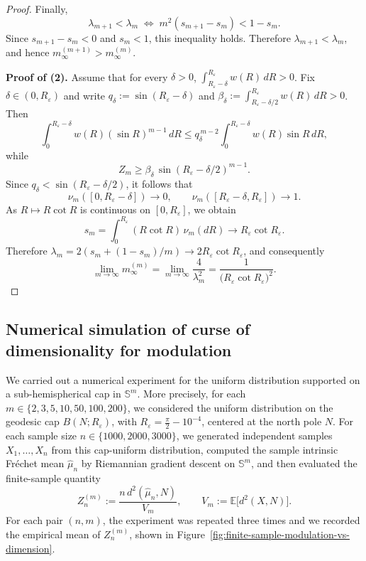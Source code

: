 \documentclass{amsart}
\theoremstyle{definition}
\theoremstyle{remark}
\newcommand\0{\boldsymbol{0}}
\begin{document}
\begin{proof}
Finally,
\[
\lambda_{m+1}<\lambda_m
\;\Longleftrightarrow\;
m^2(s_{m+1}-s_m)<1-s_m.
\]
Since \(s_{m+1}-s_m<0\) and \(s_m<1\), this inequality holds.  Therefore \(\lambda_{m+1}<\lambda_m\), and hence \(m_\infty^{(m+1)}>m_\infty^{(m)}\).

\textbf{Proof of (2).}
Assume that for every \(\delta>0\), \(\int_{R_\varepsilon-\delta}^{R_\varepsilon}w(R)\,dR>0\).  Fix \(\delta\in(0,R_\varepsilon)\) and write \(q_\delta:=\sin(R_\varepsilon-\delta)\) and \(\beta_\delta:=\int_{R_\varepsilon-\delta/2}^{R_\varepsilon}w(R)\,dR>0\).  Then
\[
\int_0^{R_\varepsilon-\delta}w(R)(\sin R)^{m-1}\,dR
\le
q_\delta^{\,m-2}\int_0^{R_\varepsilon-\delta}w(R)\sin R\,dR,
\]
while
\[
Z_m\ge \beta_\delta\,\sin(R_\varepsilon-\delta/2)^{m-1}.
\]
Since \(q_\delta<\sin(R_\varepsilon-\delta/2)\), it follows that
\[
\nu_m([0,R_\varepsilon-\delta])\to0,
\qquad
\nu_m([R_\varepsilon-\delta,R_\varepsilon])\to1.
\]
As \(R\mapsto R\cot R\) is continuous on \([0,R_\varepsilon]\), we obtain
\[
s_m=\int_0^{R_\varepsilon}(R\cot R)\,\nu_m(dR)
\longrightarrow
R_\varepsilon\cot R_\varepsilon.
\]
Therefore \(\lambda_m=2(s_m+(1-s_m)/m)\to 2R_\varepsilon\cot R_\varepsilon\), and consequently
\[
\lim_{m\to\infty}m_\infty^{(m)}
=
\lim_{m\to\infty}\frac{4}{\lambda_m^2}
=
\frac{1}{\bigl(R_\varepsilon\cot R_\varepsilon\bigr)^2}.
\]
\end{proof}

\subsection{Numerical simulation of curse of dimensionality for modulation}
\label{subsec:numerical-curse-dim-modulation}

We carried out a numerical experiment for the uniform distribution supported on a sub-hemispherical cap in \(\mathbb S^m\).  More precisely, for each \(m\in\{2,3,5,10,50,100,200\}\), we considered the uniform distribution on the geodesic cap \(B(N;R_\varepsilon)\), with \(R_\varepsilon=\frac{\pi}{2}-10^{-4}\), centered at the north pole \(N\).  For each sample size \(n\in\{1000,2000,3000\}\), we generated independent samples \(X_1,\dots,X_n\) from this cap-uniform distribution, computed the sample intrinsic Fr\'echet mean \(\hat\mu_n\) by Riemannian gradient descent on \(\mathbb S^m\), and then evaluated the finite-sample quantity
\[
Z_n^{(m)}:=\frac{n\,d^2(\hat\mu_n,N)}{V_m},
\qquad
V_m:=\mathbb E\bigl[d^2(X,N)\bigr].
\]
For each pair \((n,m)\), the experiment was repeated three times and we recorded the empirical mean of \(Z_n^{(m)}\), shown in Figure~\ref{fig:finite-sample-modulation-vs-dimension}.
\end{document}

